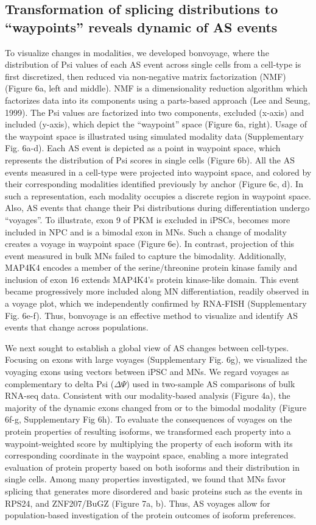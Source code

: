 \subsection{Transformation of splicing distributions to ``waypoints'' reveals dynamic of AS events}

To visualize changes in modalities, we developed bonvoyage, where the distribution of Psi values of each AS event across single cells from a cell-type is first discretized, then reduced via non-negative matrix factorization (NMF) (Figure 6a, left and middle). NMF is a dimensionality reduction algorithm which factorizes data into its components using a parts-based approach (Lee and Seung, 1999). The Psi values are factorized into two components, excluded (x-axis) and included (y-axis), which depict the ``waypoint'' space (Figure 6a, right). Usage of the waypoint space is illustrated using simulated modality data (Supplementary Fig. 6a-d). Each AS event is depicted as a point in waypoint space, which represents the distribution of Psi scores in single cells (Figure 6b). All the AS events measured in a cell-type were projected into waypoint space, and colored by their corresponding modalities identified previously by anchor (Figure 6c, d). In such a representation, each modality occupies a discrete region in waypoint space. Also, AS events that change their Psi distributions during differentiation undergo ``voyages''. To illustrate, exon 9 of PKM is excluded in iPSCs, becomes more included in NPC and is a bimodal exon in MNs. Such a change of modality creates a voyage in waypoint space (Figure 6e). In contrast, projection of this event measured in bulk MNs failed to capture the bimodality. Additionally, MAP4K4 encodes a member of the serine/threonine protein kinase family and inclusion of exon 16 extends MAP4K4's protein kinase-like domain. This event became progressively more included along MN differentiation, readily observed in a voyage plot, which we independently confirmed by RNA-FISH (Supplementary Fig. 6e-f). Thus, bonvoyage is an effective method to visualize and identify AS events that change across populations.

We next sought to establish a global view of AS changes between cell-types. Focusing on exons with large voyages (Supplementary Fig. 6g), we visualized the voyaging exons using vectors between iPSC and MNs. We regard voyages as complementary to delta Psi ($\Delta\Psi$) used in two-sample AS comparisons of bulk RNA-seq data. Consistent with our modality-based analysis (Figure 4a), the majority of the dynamic exons changed from or to the bimodal modality (Figure 6f-g, Supplementary Fig 6h). To evaluate the consequences of voyages on the protein properties of resulting isoforms, we transformed each property into a waypoint-weighted score by multiplying the property of each isoform with its corresponding coordinate in the waypoint space, enabling a more integrated evaluation of protein property based on both isoforms and their distribution in single cells. Among many properties investigated, we found that MNs favor splicing that generates more disordered and basic proteins such as the events in RPS24, and ZNF207/BuGZ (Figure 7a, b). Thus, AS voyages allow for population-based investigation of the protein outcomes of isoform preferences.

